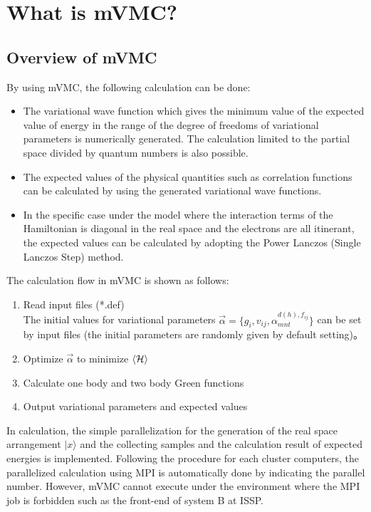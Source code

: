\chapter{What is mVMC?}
\label{Ch:whatismVMC}
\section{Overview of mVMC}
By using mVMC, the following calculation can be done:
\begin{itemize}
\item{The variational wave function which gives the minimum value of the expected value of energy in the range of the degree of freedoms of variational parameters is numerically generated. The calculation limited to the partial space divided by quantum numbers is also possible. }
\item{The expected values of the physical quantities such as correlation functions can be calculated by using the generated variational wave functions.}
\item{
In the specific case under the model where the interaction terms of the Hamiltonian is diagonal in the real space and the electrons are all itinerant, 
the expected values can be calculated by adopting the Power Lanczos (Single Lanczos Step) method.
}
\end{itemize}

The calculation flow in mVMC is shown as follows:
\begin{enumerate}
\item{Read input files (*.def)}\\
The initial values for variational parameters $\vec{\alpha}=\{ g_i, v_{ij}, \alpha_{mnt}^{d(h), f_{ij}}\}$  can be set by input files (the initial parameters are randomly given by default setting)。
\item{Optimize $\vec{\alpha}$ to minimize $\langle {\cal H} \rangle$}
\item{Calculate one body and two body Green functions}
\item{Output variational parameters and expected values}
\end{enumerate}
In calculation, the simple parallelization for the generation of the real space arrangement $|x\rangle$ and the collecting samples and the calculation result of expected energies is implemented. Following the procedure for each cluster computers, the parallelized calculation using MPI is automatically done by indicating the parallel number. However, mVMC cannot execute under the environment where the MPI job is forbidden such as the front-end of system B at ISSP.

